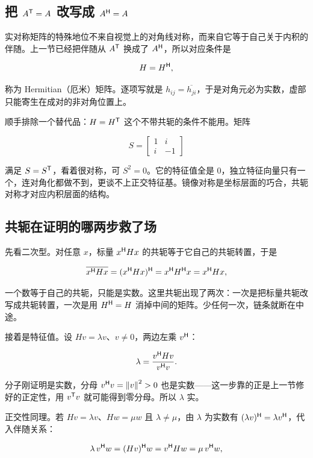 \subsection{\texorpdfstring{把 \(A^{\mathsf{T}}=A\) 改写成 \(A^{\mathsf{H}}=A\)}{把 A 转置等于 A 改写成 A 共轭转置等于 A}}

实对称矩阵的特殊地位不来自视觉上的对角线对称，而来自它等于自己关于内积的伴随。上一节已经把伴随从 \(A^{\mathsf{T}}\) 换成了 \(A^{\mathsf{H}}\)，所以对应条件是

\[
H=H^{\mathsf{H}},
\]

称为 Hermitian（厄米）矩阵。逐项写就是 \(h_{ij}=\overline{h_{ji}}\)，于是对角元必为实数，虚部只能寄生在成对的非对角位置上。

顺手排除一个替代品：\(H=H^{\mathsf{T}}\) 这个不带共轭的条件不能用。矩阵

\[
S=\begin{bmatrix}1&i\\i&-1\end{bmatrix}
\]

满足 \(S=S^{\mathsf{T}}\)，看着很对称，可 \(S^2=0\)。它的特征值全是 \(0\)，独立特征向量只有一个，连对角化都做不到，更谈不上正交特征基。镜像对称是坐标层面的巧合，共轭对称才对应内积层面的结构。

\subsection{共轭在证明的哪两步救了场}

先看二次型。对任意 \(x\)，标量 \(x^{\mathsf{H}}Hx\) 的共轭等于它自己的共轭转置，于是

\[
\overline{x^{\mathsf{H}}Hx}=(x^{\mathsf{H}}Hx)^{\mathsf{H}}=x^{\mathsf{H}}H^{\mathsf{H}}x=x^{\mathsf{H}}Hx,
\]

一个数等于自己的共轭，只能是实数。这里共轭出现了两次：一次是把标量共轭改写成共轭转置，一次是用 \(H^{\mathsf{H}}=H\) 消掉中间的矩阵。少任何一次，链条就断在中途。

接着是特征值。设 \(Hv=\lambda v\)、\(v\ne0\)，两边左乘 \(v^{\mathsf{H}}\)：

\[
\lambda=\frac{v^{\mathsf{H}}Hv}{v^{\mathsf{H}}v}.
\]

分子刚证明是实数，分母 \(v^{\mathsf{H}}v=\left\lVert v\right\rVert^2>0\) 也是实数——这一步靠的正是上一节修好的正定性，用 \(v^{\mathsf{T}}v\) 就可能得到零分母。所以 \(\lambda\) 实。

正交性同理。若 \(Hv=\lambda v\)、\(Hw=\mu w\) 且 \(\lambda\ne\mu\)，由 \(\lambda\) 为实数有 \((\lambda v)^{\mathsf{H}}=\lambda v^{\mathsf{H}}\)，代入伴随关系：

\[
\lambda\, v^{\mathsf{H}}w=(Hv)^{\mathsf{H}}w=v^{\mathsf{H}}Hw=\mu\, v^{\mathsf{H}}w,
\]

